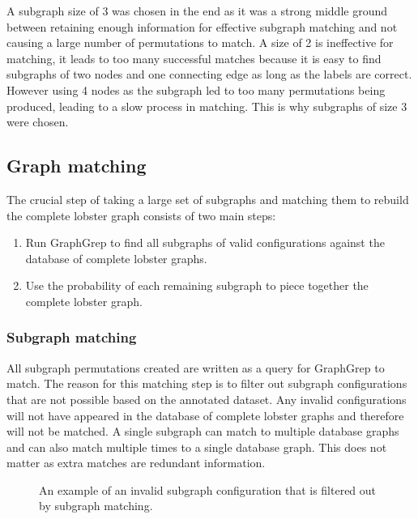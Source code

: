 \noindent
A subgraph size of 3 was chosen in the end as it was a strong middle ground between retaining enough information for effective subgraph matching and not causing a large number of permutations to match. A size of 2 is ineffective for matching, it leads to too many successful matches because it is easy to find subgraphs of two nodes and one connecting edge as long as the labels are correct. However using 4 nodes as the subgraph led to too many permutations being produced, leading to a slow process in matching. This is why subgraphs of size 3 were chosen.


\subsection{Graph matching}
The crucial step of taking a large set of subgraphs and matching them to rebuild the complete lobster graph consists of two main steps:
\begin{enumerate}
\item Run GraphGrep to find all subgraphs of valid configurations against the database of complete lobster graphs. 
\item Use the probability of each remaining subgraph to piece together the complete lobster graph.
\end{enumerate}
\subsubsection{Subgraph matching}
All subgraph permutations created are written as a query for GraphGrep to match. The reason for this matching step is to filter out subgraph configurations that are not  possible based on the annotated dataset. Any invalid configurations will not have appeared in the database of complete lobster graphs and therefore will not be matched. A single subgraph can match to multiple database graphs and can also match multiple times to a single database graph. This does not matter as extra matches are redundant information. 
\begin{figure}[H]
\centering
{}
\caption{An example of an invalid subgraph configuration that is filtered out by subgraph matching.}
\end{figure}

